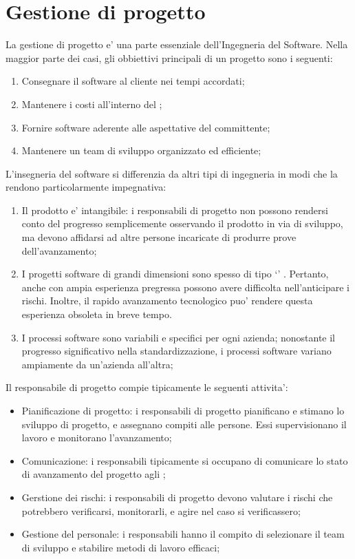 \section{Gestione di progetto}
La gestione di progetto e' una parte essenziale dell'Ingegneria del Software. Nella maggior parte dei casi, gli obbiettivi principali di un progetto sono i seguenti:
\begin{enumerate}
	\item Consegnare il software al cliente nei tempi accordati;
	\item Mantenere i costi all'interno del ;
	\item Fornire software aderente alle aspettative del committente;
	\item Mantenere un team di sviluppo organizzato ed efficiente;
\end{enumerate}

L'insegneria del software si differenzia da altri tipi di ingegneria in modi che la rendono particolarmente impegnativa:
\begin{enumerate}
	\item Il prodotto e' intangibile: i responsabili di progetto non possono rendersi conto del progresso semplicemente osservando il prodotto in via di sviluppo, ma devono affidarsi ad altre persone incaricate di produrre prove dell'avanzamento; 
	\item I progetti software di grandi dimensioni sono spesso di tipo `' . Pertanto, anche  con ampia esperienza pregressa possono avere difficolta nell'anticipare i rischi. Inoltre, il rapido avanzamento tecnologico puo' rendere questa esperienza obsoleta in breve tempo.
	\item I processi software sono variabili e specifici per ogni azienda; nonostante il progresso significativo nella standardizzazione, i processi software variano ampiamente da un'azienda all'altra;
\end{enumerate}

Il responsabile di progetto compie tipicamente le seguenti attivita':
\begin{itemize}
	\item Pianificazione di progetto: i responsabili di progetto pianificano e stimano lo sviluppo di progetto, e assegnano compiti alle persone. Essi supervisionano il lavoro e monitorano l'avanzamento;
	\item Comunicazione: i responsabili tipicamente si occupano di comunicare lo stato di avanzamento del progetto agli ;
	\item Gerstione dei rischi: i responsabili di progetto devono valutare i rischi che potrebbero verificarsi, monitorarli, e agire nel caso si verificassero;
	\item Gestione del personale: i responsabili hanno il compito di selezionare il team di sviluppo e stabilire metodi di lavoro efficaci;
\end{itemize}

